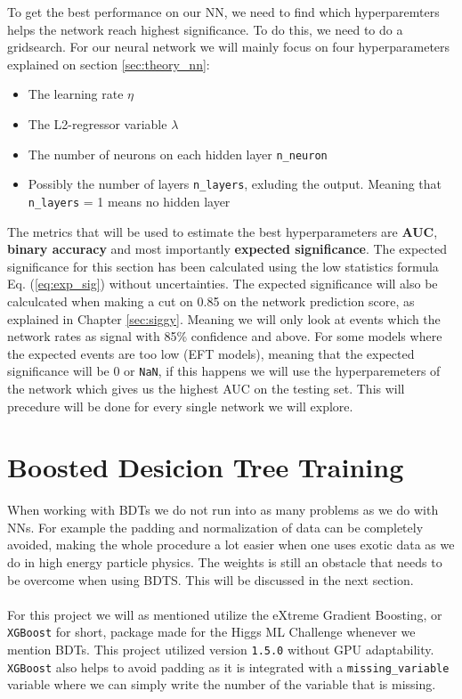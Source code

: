 \documentclass[14pt, a4paper]{book}
\begin{document}
To get the best performance on our NN, we need to find which hyperparemters helps the network reach highest significance. To do this, we need to do a gridsearch. 
For our neural network we will mainly focus on four hyperparameters explained on section \ref{sec:theory_nn}:
\begin{itemize}
   \item The learning rate $\eta$
   \item The L2-regressor variable $\lambda$
   \item The number of neurons on each hidden layer \verb|n_neuron|
   \item Possibly the number of layers \verb|n_layers|, exluding the output. Meaning that \verb|n_layers| = 1 means no hidden layer
\end{itemize}
The metrics that will be used to estimate the best hyperparameters are \textbf{AUC}, \textbf{binary accuracy} and most importantly \textbf{expected significance}. 
The expected significance for this section has been calculated using the low statistics formula Eq. (\ref{eq:exp_sig}) without uncertainties. The expected significance will also be calculcated when making a cut on 0.85 on the network prediction score, as explained in Chapter \ref{sec:siggy}. 
Meaning we will only look at events which the network rates as signal with 85\% confidence and above. For some models where the expected events are too low (EFT models), meaning that the expected significance will be 0 or \verb|NaN|, if this happens we will use the hyperparemeters of the network 
which gives us the highest AUC on the testing set. This will precedure will be done for every single network we will explore.
\clearpage


\section{Boosted Desicion Tree Training}
When working with BDTs we do not run into as many problems as we do with NNs. For example the padding and normalization of data can be completely avoided, making the whole procedure a lot easier when one uses exotic data as we do in high energy particle physics.
The weights is still an obstacle that needs to be overcome when using BDTS. This will be discussed in the next section.\\
\\For this project we will as mentioned utilize the eXtreme Gradient Boosting, or \verb|XGBoost| for short, package \cite{XGBoost} made for the Higgs ML Challenge \cite{HiggsChallenge} whenever we mention BDTs.
This project utilized version \verb|1.5.0| without GPU adaptability. \verb|XGBoost| also helps to avoid padding as it is integrated with a \verb|missing_variable| variable where we can simply write the number of the variable that is missing.
\end{document}
